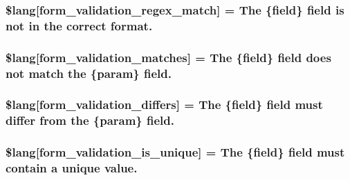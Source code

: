 \subsubsection[{\$lang}]{\setlength{\rightskip}{0pt plus 5cm}\$lang\mbox{[}\textquotesingle{}form\+\_\+validation\+\_\+regex\+\_\+match\textquotesingle{}\mbox{]} = \textquotesingle{}The \{field\} field is not in the correct format.\textquotesingle{}}\label{form__validation__lang_8php_a3642194a4f8f60f9588a66d6b2096755}
\hypertarget{form__validation__lang_8php_acdae85274ab41f354dc69117ff100389}{}
\subsubsection[{\$lang}]{\setlength{\rightskip}{0pt plus 5cm}\$lang\mbox{[}\textquotesingle{}form\+\_\+validation\+\_\+matches\textquotesingle{}\mbox{]} = \textquotesingle{}The \{field\} field does not match the \{param\} field.\textquotesingle{}}\label{form__validation__lang_8php_acdae85274ab41f354dc69117ff100389}
\hypertarget{form__validation__lang_8php_a2df815034671ae2aae09c5d8697d8ebf}{}
\subsubsection[{\$lang}]{\setlength{\rightskip}{0pt plus 5cm}\$lang\mbox{[}\textquotesingle{}form\+\_\+validation\+\_\+differs\textquotesingle{}\mbox{]} = \textquotesingle{}The \{field\} field must differ from the \{param\} field.\textquotesingle{}}\label{form__validation__lang_8php_a2df815034671ae2aae09c5d8697d8ebf}
\hypertarget{form__validation__lang_8php_ae450f8ce514e6c43b78599c8535c1647}{}
\subsubsection[{\$lang}]{\setlength{\rightskip}{0pt plus 5cm}\$lang\mbox{[}\textquotesingle{}form\+\_\+validation\+\_\+is\+\_\+unique\textquotesingle{}\mbox{]} = \textquotesingle{}The \{field\} field must contain {\bf a} unique value.\textquotesingle{}}\label{form__validation__lang_8php_ae450f8ce514e6c43b78599c8535c1647}
\hypertarget{form__validation__lang_8php_a10a669b7755f5eb6c4c0b5d8ad7af449}{}
